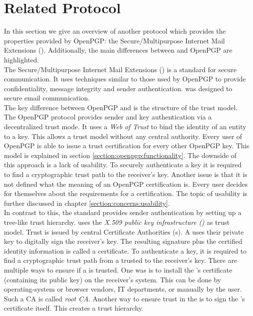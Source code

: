 \section{Related Protocol} \label{section:openpgp:smime}

In this section we give an overview of another protocol which provides the properties provided by OpenPGP: the Secure/Multipurpose Internet Mail Extensions (). Additionally, the main differences between  and OpenPGP are highlighted. \\

The Secure/Multipurpose Internet Mail Extensions () \citep{RFC5751} is a standard for secure communication. It uses techniques similar to those used by OpenPGP to provide confidentiality, message integrity and sender authentication.  was designed to secure email communication.  \\

The key difference between OpenPGP and  is the structure of the trust model.  \\

The {OpenPGP} protocol provides sender and key authentication via a decentralized trust mode. It uses a \textit{Web of Trust} to bind the identity of an entity to a key. This allows a trust model without any central authority. Every user of OpenPGP is able to issue a trust certification for every other OpenPGP key. This model is explained in section \ref{section:openpgp:functionality}. The downside of this approach is a lack of usability. To securely authenticate a key it is required to find a cryptographic trust path to the receiver's key. Another issue is that it is not defined what the meaning of an OpenPGP certification is. Every user decides for themselves about the requirements for a certification. The topic of usability is further discussed in chapter \ref{section:concerns:usability}. \\

In contrast to this, the  standard \citep{RFC5751} provides sender authentication by setting up a tree-like trust hierarchy.  uses the \textit{X.509 public key infrastructure ()} \citep{RFC5280} as trust model. Trust is issued by central Certificate Authorities (s). A  uses their private key to digitally sign the receiver's key. The resulting signature plus the certified identity information is called a certificate. To authenticate a key, it is required to find a cryptographic trust path from a trusted  to the receiver's key. There are multiple ways to ensure if a  is trusted. One was is to install the 's certificate (containing its public key) on the receiver's system. This can be done by operating-system or browser vendors, IT departments, or manually by the user. Such a CA is called \textit{root CA}. Another way to ensure trust in the  is to sign the 's certificate itself. This creates a trust hierarchy. \\

